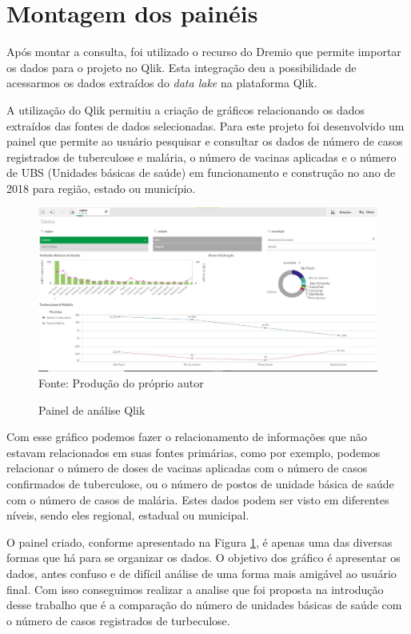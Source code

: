 \documentclass[
	12pt,				%
	openright,			%
	oneside,			%
	a4paper,			%
	chapter=TITLE,		%
	section=TITLE,		%
	subsection=TITLE,	%
	subsubsection=TITLE,%
	english,			%
	brazil				%
	]{abntex2}
\theoremstyle{definition}
\begin{document}
\section{Montagem dos painéis}
    
    Após montar a consulta, foi utilizado o recurso do Dremio que permite importar os dados para o projeto no Qlik. Esta integração deu a possibilidade de acessarmos os dados extraídos do \textit{data lake} na plataforma Qlik. 
    
    A utilização do Qlik permitiu a criação de gráficos relacionando os dados extraídos das fontes de dados selecionadas. Para este projeto foi desenvolvido um painel que permite ao usuário pesquisar e consultar os dados de número de casos registrados de tuberculose e malária, o número de vacinas aplicadas e o número de UBS (Unidades básicas de saúde) em funcionamento e construção no ano de 2018 para região, estado ou município.
    
    \begin{figure}[H]
         \centering
         \caption{Painel de análise Qlik}
         \includegraphics[scale=0.4]{imagens/paneil-total.JPG}
         \\{\footnotesize Fonte: Produção do próprio autor}
         \label{painel qlik}
    \end{figure}
    
    Com esse gráfico podemos fazer o relacionamento de informações que não estavam relacionados em suas fontes primárias, como por exemplo, podemos relacionar o número de doses de vacinas aplicadas com o número de casos confirmados de tuberculose, ou o número de postos de unidade básica de saúde com o número de casos de malária. Estes dados podem ser visto em diferentes níveis, sendo eles regional, estadual ou municipal. 
    
    O painel criado, conforme apresentado na Figura \ref{painel qlik}, é apenas uma das diversas formas que há para se organizar os dados. O objetivo dos gráfico é apresentar os dados, antes confuso e de difícil análise de uma forma mais amigável ao usuário final. Com isso conseguimos realizar a analise que foi proposta na introdução desse trabalho que é a comparação do número de unidades básicas de saúde com o número de casos registrados de turbeculose.
    
\end{document}

